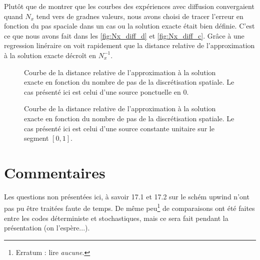 \documentclass[11pt,a4paper]{article}
\begin{document}
Plutôt que de montrer que les courbes des expériences avec diffusion convergaient quand $N_x$ tend vers de gradnes valeurs, nous avons choisi de tracer l'erreur en fonction du pas spaciale dans un cas ou la solution exacte était bien définie. C'est ce que nous avons fait dans les \autoref{fig:Nx_diff_d} et \autoref{fig:Nx_diff_c}. Grâce à une regression linéraire on voit rapidement que la distance relative de l'approximation à la solution exacte décroît en $N_x^{-1}$.

\begin{figure}
  \centering
  
  \caption{Courbe de la distance relative de l'approximation à la solution exacte en fonction du nombre de pas de la discrétisation spatiale. Le cas présenté ici est celui d'une source ponctuelle en 0.}
  \label{fig:Nx_diff_d}
\end{figure}

\begin{figure}
  \centering
  
  \caption{Courbe de la distance relative de l'approximation à la solution exacte en fonction du nombre de pas de la discrétisation spatiale. Le cas présenté ici est celui d'une source constante unitaire sur le segment $[0,1]$.}
  \label{fig:Nx_diff_c}
\end{figure}




\section{Commentaires}
Les questions non présentées ici, à savoir 17.1 et 17.2 sur le schém upwind n'ont pas pu être traitées faute de temps. De même peu\footnote{Erratum : lire \emph{aucune}.} de comparaisons ont été faites entre les codes déterministe et stochastiques, mais ce sera fait pendant la présentation (on l'espère...).
\end{document}
